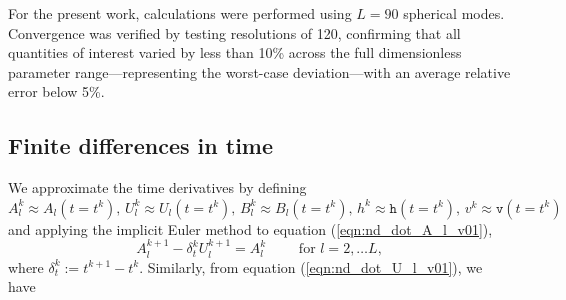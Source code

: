 \documentclass{jfm}
\newcommand{\aproxsol}[1]{\mathtt{#1}}
\begin{document}
For the present work, calculations were performed using $L=90$ spherical modes. Convergence was verified by testing resolutions of 120, confirming that all quantities of interest varied by less than 10\% across the full dimensionless parameter range—representing the worst-case deviation—with an average relative error below 5\%.

\subsection{Finite differences in time} \label{subsubsec:finitedifferencesintime}

We approximate the time derivatives by defining
$A_l^k \approx A_l(t=t^k) \text{, } U_l^k \approx U_l(t=t^k)\text{, } B_l^k \approx B_l(t=t^k) \text{, } h^k \approx \aproxsol{h}(t=t^k) \text{, } v^k \approx \aproxsol{v}(t=t^k)$ and applying the implicit Euler method to equation (\ref{eqn:nd_dot_A_l_v01}),
\begin{equation}\label{eqn:IE_dot_A_l}
    A^{k+1}_l -\delta_t^k U^{k+1}_l = A^k_l \qquad \text{ for } l = 2, \ldots L,
\end{equation}
where $\delta^k_t := t^{k+1}-t^k$.  Similarly, from equation (\ref{eqn:nd_dot_U_l_v01}), we have
\end{document}
